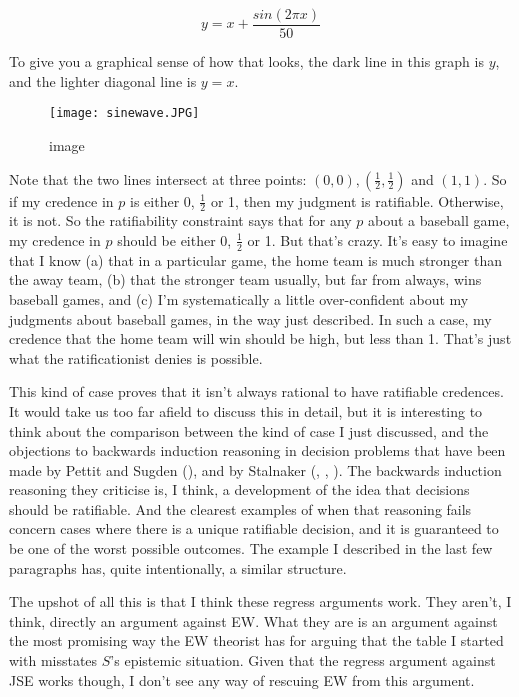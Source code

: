 \documentclass[
  11pt,
  letterpaper,
  DIV=11,
  numbers=noendperiod,
  oneside]{scrartcl}
\begin{document}
\[y = x + \frac{sin(2\pi x)}{50}\]

To give you a graphical sense of how that looks, the dark line in this
graph is \(y\), and the lighter diagonal line is \(y = x\).

\begin{figure}[H]

{\centering \texttt{[image: sinewave.JPG]}

}

\caption{image}

\end{figure}%

Note that the two lines intersect at three points:
\((0, 0), (\frac{1}{2}, \frac{1}{2})\) and \((1, 1)\). So if my credence
in \(p\) is either 0, \(\frac{1}{2}\) or 1, then my judgment is
ratifiable. Otherwise, it is not. So the ratifiability constraint says
that for any \(p\) about a baseball game, my credence in \(p\) should be
either 0, \(\frac{1}{2}\) or 1. But that's crazy. It's easy to imagine
that I know (a) that in a particular game, the home team is much
stronger than the away team, (b) that the stronger team usually, but far
from always, wins baseball games, and (c) I'm systematically a little
over-confident about my judgments about baseball games, in the way just
described. In such a case, my credence that the home team will win
should be high, but less than 1. That's just what the ratificationist
denies is possible.

This kind of case proves that it isn't always rational to have
ratifiable credences. It would take us too far afield to discuss this in
detail, but it is interesting to think about the comparison between the
kind of case I just discussed, and the objections to backwards induction
reasoning in decision problems that have been made by Pettit and Sugden
(), and by Stalnaker
(, ,
). The backwards induction reasoning
they criticise is, I think, a development of the idea that decisions
should be ratifiable. And the clearest examples of when that reasoning
fails concern cases where there is a unique ratifiable decision, and it
is guaranteed to be one of the worst possible outcomes. The example I
described in the last few paragraphs has, quite intentionally, a similar
structure.

The upshot of all this is that I think these regress arguments work.
They aren't, I think, directly an argument against EW. What they are is
an argument against the most promising way the EW theorist has for
arguing that the table I started with misstates \(S\)'s epistemic
situation. Given that the regress argument against JSE works though, I
don't see any way of rescuing EW from this argument.
\end{document}

